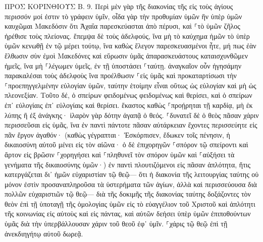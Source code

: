 \documentclass[twoside, 9pt]{extreport}
\begin{document}
ΠΡΟΣ ΚΟΡΙΝΘΙΟΥΣ Β.
9.
Περὶ μὲν γὰρ τῆς διακονίας τῆς εἰς τοὺς ἁγίους περισσόν μοί ἐστιν τὸ γράφειν ὑμῖν, 
οἶδα γὰρ τὴν προθυμίαν ὑμῶν ἣν ὑπὲρ ὑμῶν καυχῶμαι Μακεδόσιν ὅτι Ἀχαΐα παρεσκεύασται ἀπὸ πέρυσι, καὶ ⸀τὸ ὑμῶν ζῆλος ἠρέθισε τοὺς πλείονας. 
ἔπεμψα δὲ τοὺς ἀδελφούς, ἵνα μὴ τὸ καύχημα ἡμῶν τὸ ὑπὲρ ὑμῶν κενωθῇ ἐν τῷ μέρει τούτῳ, ἵνα καθὼς ἔλεγον παρεσκευασμένοι ἦτε, 
μή πως ἐὰν ἔλθωσιν σὺν ἐμοὶ Μακεδόνες καὶ εὕρωσιν ὑμᾶς ἀπαρασκευάστους καταισχυνθῶμεν ἡμεῖς, ἵνα μὴ ⸀λέγωμεν ὑμεῖς, ἐν τῇ ὑποστάσει ⸀ταύτῃ. 
ἀναγκαῖον οὖν ἡγησάμην παρακαλέσαι τοὺς ἀδελφοὺς ἵνα προέλθωσιν ⸀εἰς ὑμᾶς καὶ προκαταρτίσωσι τὴν ⸀προεπηγγελμένην εὐλογίαν ὑμῶν, ταύτην ἑτοίμην εἶναι οὕτως ὡς εὐλογίαν καὶ μὴ ὡς πλεονεξίαν. 
Τοῦτο δέ, ὁ σπείρων φειδομένως φειδομένως καὶ θερίσει, καὶ ὁ σπείρων ἐπ᾽ εὐλογίαις ἐπ᾽ εὐλογίαις καὶ θερίσει. 
ἕκαστος καθὼς ⸀προῄρηται τῇ καρδίᾳ, μὴ ἐκ λύπης ἢ ἐξ ἀνάγκης· ἱλαρὸν γὰρ δότην ἀγαπᾷ ὁ θεός. 
⸀δυνατεῖ δὲ ὁ θεὸς πᾶσαν χάριν περισσεῦσαι εἰς ὑμᾶς, ἵνα ἐν παντὶ πάντοτε πᾶσαν αὐτάρκειαν ἔχοντες περισσεύητε εἰς πᾶν ἔργον ἀγαθόν· 
(καθὼς γέγραπται· Ἐσκόρπισεν, ἔδωκεν τοῖς πένησιν, ἡ δικαιοσύνη αὐτοῦ μένει εἰς τὸν αἰῶνα· 
ὁ δὲ ἐπιχορηγῶν ⸀σπόρον τῷ σπείροντι καὶ ἄρτον εἰς βρῶσιν ⸀χορηγήσει καὶ ⸀πληθυνεῖ τὸν σπόρον ὑμῶν καὶ ⸀αὐξήσει τὰ γενήματα τῆς δικαιοσύνης ὑμῶν·) 
ἐν παντὶ πλουτιζόμενοι εἰς πᾶσαν ἁπλότητα, ἥτις κατεργάζεται δι᾽ ἡμῶν εὐχαριστίαν τῷ θεῷ— 
ὅτι ἡ διακονία τῆς λειτουργίας ταύτης οὐ μόνον ἐστὶν προσαναπληροῦσα τὰ ὑστερήματα τῶν ἁγίων, ἀλλὰ καὶ περισσεύουσα διὰ πολλῶν εὐχαριστιῶν τῷ θεῷ— 
διὰ τῆς δοκιμῆς τῆς διακονίας ταύτης δοξάζοντες τὸν θεὸν ἐπὶ τῇ ὑποταγῇ τῆς ὁμολογίας ὑμῶν εἰς τὸ εὐαγγέλιον τοῦ Χριστοῦ καὶ ἁπλότητι τῆς κοινωνίας εἰς αὐτοὺς καὶ εἰς πάντας, 
καὶ αὐτῶν δεήσει ὑπὲρ ὑμῶν ἐπιποθούντων ὑμᾶς διὰ τὴν ὑπερβάλλουσαν χάριν τοῦ θεοῦ ἐφ᾽ ὑμῖν. 
⸀χάρις τῷ θεῷ ἐπὶ τῇ ἀνεκδιηγήτῳ αὐτοῦ δωρεᾷ. 
\end{document}
